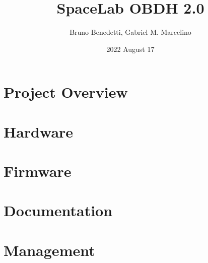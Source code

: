 \documentclass{beamer}
\title[Presentation]{SpaceLab OBDH 2.0}
\author[SpaceLab]{Bruno Benedetti, Gabriel M. Marcelino}
\institute[]{SpaceLab - UFSC}
\date{2022 August 17}
\begin{document}
    
    

    \section{Project Overview}

        

    \section{Hardware}

        

    \section{Firmware}

        

    \section{Documentation}

        

    \section{Management}

        

\end{document}

